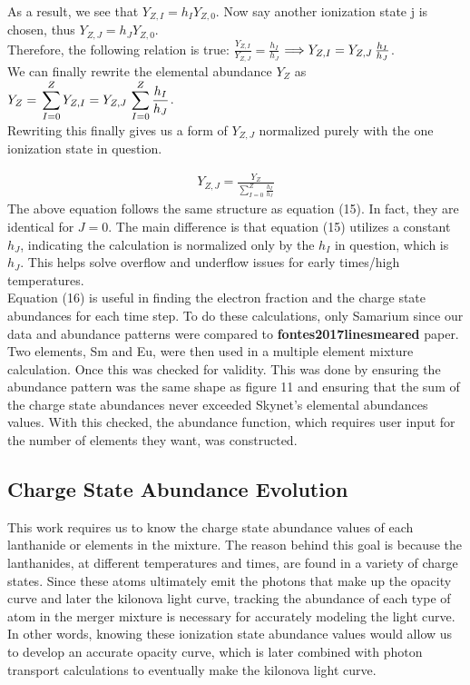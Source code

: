 \documentclass[11pt,a4paper]{article}
\begin{document}
As a result, we see that $Y_{Z,I} = h_I  Y_{Z,0}$. Now say another ionization state j is chosen, thus $Y_{Z,J} = h_J  Y_{Z,0}$. \\

Therefore, the following relation is true:
$\frac{Y_{Z,I}}{Y_{Z,J}} = \frac{h_I}{h_J} $ $\Longrightarrow
Y_{Z,I} = Y_{Z,J}\thinspace \frac{h_I}{h_J}$. \\

We can finally rewrite the elemental abundance $Y_Z$ as $Y_Z =\thinspace \displaystyle \sum_{I=0}^{Z} Y_{Z,I} = Y_{Z,J}\thinspace \displaystyle \sum_{I=0}^{Z} \frac{h_I}{h_J} $.\\

Rewriting this finally gives us a form of $Y_{Z,J}$ normalized purely with the one ionization state in question. 

\begin{align}
Y_{Z,J} = \frac{Y_Z}{\displaystyle \sum_{I=0}^{Z} \frac{h_I}{h_J}}
\end{align} 
The above equation follows the same structure as equation (15). In fact, they are identical for $J=$0. The main difference is that equation (15) utilizes a constant $h_J$, indicating the calculation is normalized only by the $h_I$ in question, which is $h_J$. This helps solve overflow and underflow issues for early times/high temperatures. \\

Equation (16) is useful in finding the electron fraction and the charge state abundances for each time step. To do these calculations, only Samarium since our data and abundance patterns were compared to \textbf{fontes2017linesmeared} paper. Two elements, Sm and Eu, were then used in a multiple element mixture calculation. Once this was checked for validity. This was done by ensuring the abundance pattern was the same shape as figure 11 and ensuring that the sum of the charge state abundances never exceeded Skynet's elemental abundances values. With this checked, the abundance function, which requires user input for the number of elements they want, was constructed. 




\subsection{Charge State Abundance Evolution}

\indent This work requires us to know the charge state abundance values of each lanthanide or elements in the mixture. The reason behind this goal is because the lanthanides, at different temperatures and times, are found in a variety of charge states. Since these atoms ultimately emit the photons that make up the opacity curve and later the kilonova light curve, tracking the abundance of each type of atom in the merger mixture is necessary for accurately modeling the light curve. In other words, knowing these ionization state abundance values would allow us to develop an accurate opacity curve, which is later combined with photon transport calculations to eventually make the kilonova light curve.\\ 
\end{document}
